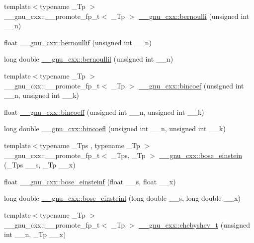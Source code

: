 \begin{DoxyCompactItemize}
\item 
{\footnotesize template$<$typename \+\_\+\+Tp $>$ }\\\+\_\+\+\_\+gnu\+\_\+cxx\+::\+\_\+\+\_\+promote\+\_\+fp\+\_\+t$<$ \+\_\+\+Tp $>$ \hyperlink{group__gnu__math__spec__func_gaebe41d6ec250e8fcc213eee9b392fd5f}{\+\_\+\+\_\+gnu\+\_\+cxx\+::bernoulli} (unsigned int \+\_\+\+\_\+n)
\item 
float \hyperlink{group__gnu__math__spec__func_gabcd77f012ae74989c4bb9ca61978481d}{\+\_\+\+\_\+gnu\+\_\+cxx\+::bernoullif} (unsigned int \+\_\+\+\_\+n)
\item 
long double \hyperlink{group__gnu__math__spec__func_gaac8f04abfdd6b744d11cb73ec1f564b1}{\+\_\+\+\_\+gnu\+\_\+cxx\+::bernoullil} (unsigned int \+\_\+\+\_\+n)
\item 
{\footnotesize template$<$typename \+\_\+\+Tp $>$ }\\\+\_\+\+\_\+gnu\+\_\+cxx\+::\+\_\+\+\_\+promote\+\_\+fp\+\_\+t$<$ \+\_\+\+Tp $>$ \hyperlink{group__gnu__math__spec__func_ga2934ccfb8bbd5877efd369a3ecd9ac4d}{\+\_\+\+\_\+gnu\+\_\+cxx\+::bincoef} (unsigned int \+\_\+\+\_\+n, unsigned int \+\_\+\+\_\+k)
\item 
float \hyperlink{group__gnu__math__spec__func_ga20ff8c4c82808c78c299634d02f3f8bd}{\+\_\+\+\_\+gnu\+\_\+cxx\+::bincoeff} (unsigned int \+\_\+\+\_\+n, unsigned int \+\_\+\+\_\+k)
\item 
long double \hyperlink{group__gnu__math__spec__func_ga6874da4660b1ef35c03e28bf09e81796}{\+\_\+\+\_\+gnu\+\_\+cxx\+::bincoefl} (unsigned int \+\_\+\+\_\+n, unsigned int \+\_\+\+\_\+k)
\item 
{\footnotesize template$<$typename \+\_\+\+Tps , typename \+\_\+\+Tp $>$ }\\\+\_\+\+\_\+gnu\+\_\+cxx\+::\+\_\+\+\_\+promote\+\_\+fp\+\_\+t$<$ \+\_\+\+Tps, \+\_\+\+Tp $>$ \hyperlink{group__gnu__math__spec__func_gacf63ebbc67ea21d569cf510ed0da95fd}{\+\_\+\+\_\+gnu\+\_\+cxx\+::bose\+\_\+einstein} (\+\_\+\+Tps \+\_\+\+\_\+s, \+\_\+\+Tp \+\_\+\+\_\+x)
\item 
float \hyperlink{group__gnu__math__spec__func_gac1fb313fba5639d4168b6ee682507688}{\+\_\+\+\_\+gnu\+\_\+cxx\+::bose\+\_\+einsteinf} (float \+\_\+\+\_\+s, float \+\_\+\+\_\+x)
\item 
long double \hyperlink{group__gnu__math__spec__func_ga995c3ff580f81afb139f9cd50f445b48}{\+\_\+\+\_\+gnu\+\_\+cxx\+::bose\+\_\+einsteinl} (long double \+\_\+\+\_\+s, long double \+\_\+\+\_\+x)
\item 
{\footnotesize template$<$typename \+\_\+\+Tp $>$ }\\\+\_\+\+\_\+gnu\+\_\+cxx\+::\+\_\+\+\_\+promote\+\_\+fp\+\_\+t$<$ \+\_\+\+Tp $>$ \hyperlink{group__gnu__math__spec__func_gae35c0bc63248e3bcdb9b490477975eb4}{\+\_\+\+\_\+gnu\+\_\+cxx\+::chebyshev\+\_\+t} (unsigned int \+\_\+\+\_\+n, \+\_\+\+Tp \+\_\+\+\_\+x)

\end{DoxyCompactItemize}
